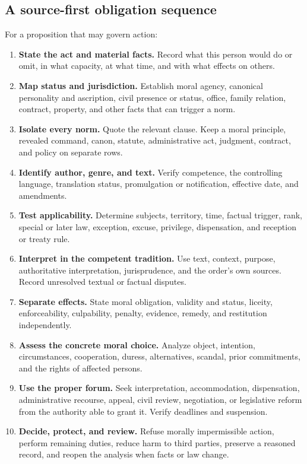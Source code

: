 \subsection{A source-first obligation sequence}

For a proposition that may govern action:

\begin{enumerate}
\item \textbf{State the act and material facts.} Record what this person would do or omit, in what capacity, at what time, and with what effects on others.
\item \textbf{Map status and jurisdiction.} Establish moral agency, canonical personality and ascription, civil presence or status, office, family relation, contract, property, and other facts that can trigger a norm.
\item \textbf{Isolate every norm.} Quote the relevant clause. Keep a moral principle, revealed command, canon, statute, administrative act, judgment, contract, and policy on separate rows.
\item \textbf{Identify author, genre, and text.} Verify competence, the controlling language, translation status, promulgation or notification, effective date, and amendments.
\item \textbf{Test applicability.} Determine subjects, territory, time, factual trigger, rank, special or later law, exception, excuse, privilege, dispensation, and reception or treaty rule.
\item \textbf{Interpret in the competent tradition.} Use text, context, purpose, authoritative interpretation, jurisprudence, and the order's own sources. Record unresolved textual or factual disputes.
\item \textbf{Separate effects.} State moral obligation, validity and status, liceity, enforceability, culpability, penalty, evidence, remedy, and restitution independently.
\item \textbf{Assess the concrete moral choice.} Analyze object, intention, circumstances, cooperation, duress, alternatives, scandal, prior commitments, and the rights of affected persons.
\item \textbf{Use the proper forum.} Seek interpretation, accommodation, dispensation, administrative recourse, appeal, civil review, negotiation, or legislative reform from the authority able to grant it. Verify deadlines and suspension.
\item \textbf{Decide, protect, and review.} Refuse morally impermissible action, perform remaining duties, reduce harm to third parties, preserve a reasoned record, and reopen the analysis when facts or law change.
\end{enumerate}


